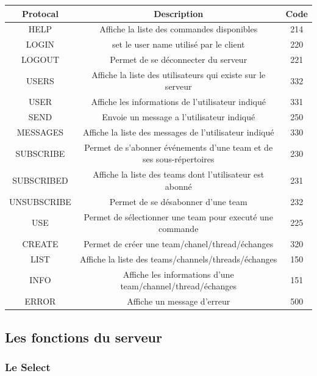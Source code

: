 \documentclass{report}
\begin{document}
\begin{tabular}{|c||c||c|}
        \hline
        Protocal & Description & Code\\
        \hline
        HELP & Affiche la liste des commandes disponibles & 214\\
        \hline
        LOGIN & set le user name utilisé par le client & 220\\
        \hline
        LOGOUT & Permet de se déconnecter du serveur & 221\\
        \hline
        USERS & Affiche la liste des utilisateurs qui existe sur le serveur & 332\\
        \hline
        USER & Affiche les informations de l'utilisateur indiqué & 331\\
        \hline
        SEND & Envoie un message a l'utilisateur indiqué & 250\\
        \hline
        MESSAGES & Affiche la liste des messages de l'utilisateur indiqué & 330\\
        \hline
        SUBSCRIBE & Permet de s'abonner événements d'une team et de ses sous-répertoires & 230\\
        \hline
        SUBSCRIBED & Affiche la liste des teams dont l'utilisateur est abonné & 231\\
        \hline
        UNSUBSCRIBE & Permet de se désabonner d'une team & 232\\
        \hline
        USE & Permet de sélectionner une team pour executé une commande & 225\\
        \hline
        CREATE & Permet de créer une team/chanel/thread/échanges & 320\\
        \hline
        LIST & Affiche la liste des teams/channels/threads/échanges& 150\\
        \hline
        INFO & Affiche les informations d'une team/channel/thread/échanges & 151\\
        \hline
        ERROR & Affiche un message d'erreur & 500\\
        \hline
\end{tabular}

\subsection{Les fonctions du serveur}

\subsubsection{Le Select}
\end{document}
